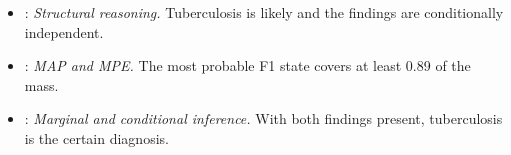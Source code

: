\begingroup\raggedright
\begin{itemize}[nosep,leftmargin=*]
\item {}: \emph{Structural reasoning.}  Tuberculosis is likely and the findings are conditionally independent.
\item {}: \emph{MAP and MPE.}  The most probable F1 state covers at least 0.89 of the mass.
\item {}: \emph{Marginal and conditional inference.}  With both findings present, tuberculosis is the certain diagnosis.
\end{itemize}
\endgroup
